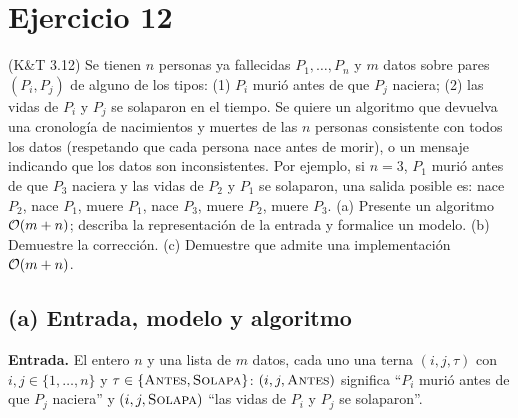 \section{Ejercicio 12}
\begin{enunciado}
(K\&T 3.12) Se tienen $n$ personas ya fallecidas $P_1,\dots,P_n$ y $m$ datos sobre pares $(P_i,P_j)$ de
alguno de los tipos: (1) $P_i$ murió antes de que $P_j$ naciera; (2) las vidas de $P_i$ y $P_j$ se
solaparon en el tiempo. Se quiere un algoritmo que devuelva una cronología de nacimientos y muertes de
las $n$ personas consistente con todos los datos (respetando que cada persona nace antes de morir), o
un mensaje indicando que los datos son inconsistentes. Por ejemplo, si $n=3$, $P_1$ murió antes de que
$P_3$ naciera y las vidas de $P_2$ y $P_1$ se solaparon, una salida posible es: nace $P_2$, nace $P_1$,
muere $P_1$, nace $P_3$, muere $P_2$, muere $P_3$.
(a) Presente un algoritmo $\mathcal{O}(m+n)$; describa la representación de la entrada y formalice un modelo.
(b) Demuestre la corrección.
(c) Demuestre que admite una implementación $\mathcal{O}(m+n)$.
\end{enunciado}

\subsection*{(a) Entrada, modelo y algoritmo}
\textbf{Entrada.} El entero $n$ y una lista de $m$ datos, cada uno una terna $(i,j,\tau)$ con
$i,j\in\{1,\dots,n\}$ y $\tau\in\{\textsc{Antes},\textsc{Solapa}\}$: $(i,j,\textsc{Antes})$ significa
``$P_i$ murió antes de que $P_j$ naciera'' y $(i,j,\textsc{Solapa})$ ``las vidas de $P_i$ y $P_j$ se
solaparon''.

